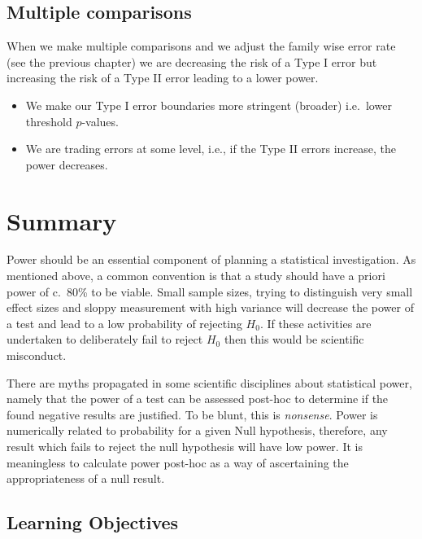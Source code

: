 \documentclass[
  oneside]{krantz}
\providecommand{\tightlist}{%
  \setlength{\itemsep}{0pt}\setlength{\parskip}{0pt}}
\begin{document}
\hypertarget{multiple-comparisons-1}{%
\subsection{Multiple comparisons}\label{multiple-comparisons-1}}

When we make multiple comparisons and we adjust the family wise error rate (see the previous chapter) we are decreasing the risk of a Type I error but increasing the risk of a Type II error leading to a lower power.

\begin{itemize}
\tightlist
\item
  We make our Type I error boundaries more stringent (broader) i.e.~lower threshold \(p\)-values.
\item
  We are trading errors at some level, i.e., if the Type II errors increase, the power decreases.
\end{itemize}

\hypertarget{SUMpower}{%
\section{Summary}\label{SUMpower}}

Power should be an essential component of planning a statistical investigation. As mentioned above, a common convention is that a study should have a priori power of c.~80\% to be viable. Small sample sizes, trying to distinguish very small effect sizes and sloppy measurement with high variance will decrease the power of a test and lead to a low probability of rejecting \(H_0\). If these activities are undertaken to deliberately fail to reject \(H_0\) then this would be scientific misconduct.

There are myths propagated in some scientific disciplines about statistical power, namely that the power of a test can be assessed post-hoc to determine if the found negative results are justified. To be blunt, this is \emph{nonsense}. Power is numerically related to probability for a given Null hypothesis, therefore, any result which fails to reject the null hypothesis will have low power. It is meaningless to calculate power post-hoc as a way of ascertaining the appropriateness of a null result.

\hypertarget{learning-objectives-2}{%
\subsection{Learning Objectives}\label{learning-objectives-2}}
\end{document}
